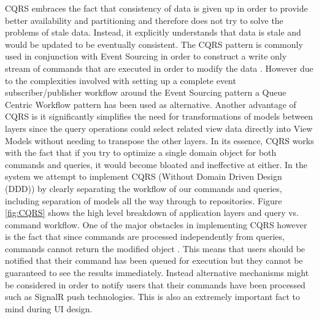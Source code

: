CQRS embraces the fact that consistency of data is given up in order to provide better availability  and partitioning and therefore does not try to solve the problems of stale data. Instead, it explicitly understands that data is stale and would be updated to be eventually consistent. The CQRS pattern is commonly used in conjunction with Event Sourcing in order to construct a write only stream of commands that are executed in order to modify the data \cite{Homer2014}. However due to the complexities involved with setting up a complete event subscriber/publisher workflow around the Event Sourcing pattern a Queue Centric Workflow pattern has been used as alternative. Another advantage of CQRS is it significantly simplifies the need for transformations of models between layers since the query operations could select related view data directly into View Models without needing to transpose the other layers. In its essence, CQRS works with the fact that if you try to optimize a single domain object for both commands and queries, it would become bloated and ineffective at either. In the system we attempt to implement CQRS (Without Domain Driven Design (DDD)) by clearly separating the workflow of our commands and queries, including separation of models all the way through to repositories. Figure \ref{fig:CQRS} shows the high level breakdown of application layers and query vs. command workflow. One of the major obstacles in implementing CQRS however is the fact that since commands are processed independently from queries, commands cannot return the modified object \cite{Homer2014}. This means that users should be notified that their command has been queued for execution but they cannot be guaranteed to see the results immediately. Instead alternative mechanisms might be considered in order to notify users that their commands have been processed such as SignalR push technologies. This is also an extremely important fact to mind during UI design.
 
 
